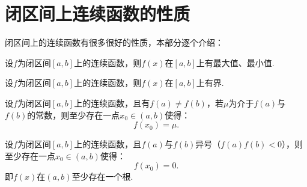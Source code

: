 \section{闭区间上连续函数的性质}

闭区间上的连续函数有很多很好的性质，本部分逐个介绍：

\begin{theorem}[最大值最小值定理]
	设$f$为闭区间$[a,b]$上的连续函数，则$f(x)$在$[a,b]$上有最大值、最小值.
\end{theorem}

\begin{corollary}[有界性定理]
	设$f$为闭区间$[a,b]$上的连续函数，则$f(x)$在$[a,b]$上有界.
\end{corollary}
	
	
\begin{theorem}[介值性定理]
	设$f$为闭区间$[a,b]$上的连续函数，且有$f(a)\neq f(b)$，若$\mu$为介于$f(a)$与$f(b)$的常数，则至少存在一点$x_0\in(a,b)$使得：
	\begin{equation}
		f(x_0)=\mu.
	\end{equation}
\end{theorem}

\begin{corollary}[根的存在性定理]
	设$f$为闭区间$[a,b]$上的连续函数，且$f(a)$与$f(b)$异号（$f(a)f(b)<0$），则至少存在一点$x_0\in (a,b)$使得：
	\begin{equation}
		f(x_0)=0.
	\end{equation}
	即$f(x)$在$(a,b)$至少存在一个根.
\end{corollary}